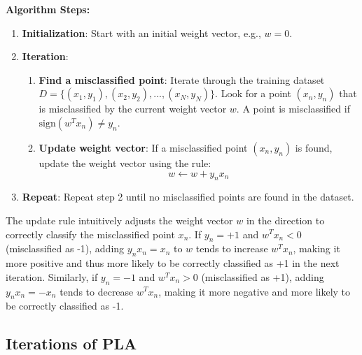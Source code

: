 \documentclass{article}
\begin{document}
\textbf{Algorithm Steps:}
\begin{enumerate}
    \item \textbf{Initialization}: Start with an initial weight vector, e.g., $w = 0$.
    \item \textbf{Iteration}:
    \begin{enumerate}
        \item \textbf{Find a misclassified point}: Iterate through the training dataset $D = \{(x_1, y_1), (x_2, y_2), ..., (x_N, y_N)\}$. Look for a point $(x_n, y_n)$ that is misclassified by the current weight vector $w$. A point is misclassified if $\text{sign}(w^T x_n) \neq y_n$.
        \item \textbf{Update weight vector}: If a misclassified point $(x_n, y_n)$ is found, update the weight vector using the rule:
        \[
        w \leftarrow w + y_n x_n
        \]
    \end{enumerate}
    \item \textbf{Repeat}: Repeat step 2 until no misclassified points are found in the dataset.
\end{enumerate}

The update rule intuitively adjusts the weight vector $w$ in the direction to correctly classify the misclassified point $x_n$.  If $y_n = +1$ and $w^T x_n < 0$ (misclassified as -1), adding $y_n x_n = x_n$ to $w$ tends to increase $w^T x_n$, making it more positive and thus more likely to be correctly classified as +1 in the next iteration. Similarly, if $y_n = -1$ and $w^T x_n > 0$ (misclassified as +1), adding $y_n x_n = -x_n$ tends to decrease $w^T x_n$, making it more negative and more likely to be correctly classified as -1.


\subsection{Iterations of PLA}
\end{document}
